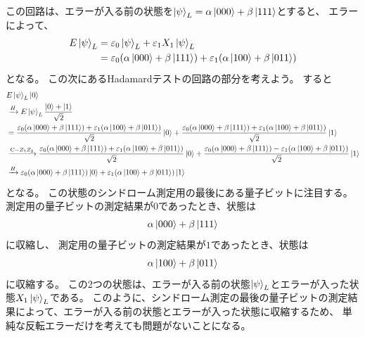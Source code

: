 \documentclass[../master.tex]{subfiles}
\begin{document}
この回路は、エラーが入る前の状態を\(\ket{\psi}_L = \alpha\ket{000}+\beta\ket{111}\)とすると、
エラーによって、
\begin{equation}\begin{aligned}[b]
    E\ket{\psi}_L &= \varepsilon_0\ket{\psi}_L + \varepsilon_1 X_1\ket{\psi}_L\\
    &= \varepsilon_0\qty(\alpha\ket{000}+\beta\ket{111}) + \varepsilon_1\qty(\alpha\ket{100}+\beta\ket{011})
\end{aligned}\end{equation}
となる。
この次にあるHadamardテストの回路の部分を考えよう。
すると
\begin{equation}\begin{aligned}[b]
    &E\ket{\psi}_L \ket{0}\\
    &\xrightarrow{H}  E\ket{\psi}_L \frac{\ket{0}+\ket{1}}{\sqrt{2}}\\
    &=\frac{\varepsilon_0\qty(\alpha\ket{000}+\beta\ket{111}) + \varepsilon_1\qty(\alpha\ket{100}+\beta\ket{011})}{\sqrt{2}}\ket{0}
    +\frac{\varepsilon_0\qty(\alpha\ket{000}+\beta\ket{111}) + \varepsilon_1\qty(\alpha\ket{100}+\beta\ket{011})}{\sqrt{2}}\ket{1}\\
    &\xrightarrow{\text{C}-Z_1Z_2}
    \frac{\varepsilon_0\qty(\alpha\ket{000}+\beta\ket{111}) + \varepsilon_1\qty(\alpha\ket{100}+\beta\ket{011})}{\sqrt{2}}\ket{0}
    +\frac{\varepsilon_0\qty(\alpha\ket{000}+\beta\ket{111}) - \varepsilon_1\qty(\alpha\ket{100}+\beta\ket{011})}{\sqrt{2}}\ket{1}\\
    &\xrightarrow{H} \varepsilon_0\qty(\alpha\ket{000}+\beta\ket{111})\ket{0} + \varepsilon_1\qty(\alpha\ket{100}+\beta\ket{011})\ket{1}
\end{aligned}\end{equation}
となる。
この状態のシンドローム測定用の最後にある量子ビットに注目する。
測定用の量子ビットの測定結果が\(0\)であったとき、状態は
\begin{equation}\begin{aligned}[b]
    \alpha\ket{000}+\beta\ket{111}
\end{aligned}\end{equation}
に収縮し、
測定用の量子ビットの測定結果が\(1\)であったとき、状態は
\begin{equation}\begin{aligned}[b]
    \alpha\ket{100}+\beta\ket{011}
\end{aligned}\end{equation}
に収縮する。
この2つの状態は、エラーが入る前の状態\(\ket{\psi}_L\)とエラーが入った状態\(X_1\ket{\psi}_L\)である。
このように、シンドローム測定の最後の量子ビットの測定結果によって、エラーが入る前の状態とエラーが入った状態に収縮するため、
単純な反転エラーだけを考えても問題がないことになる。
\end{document}
